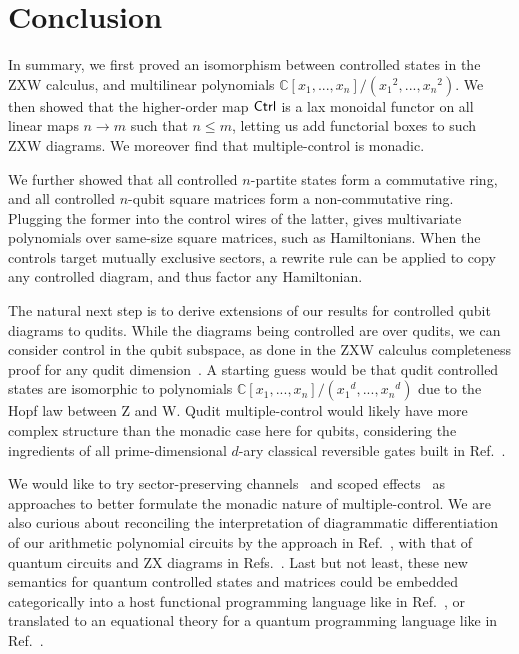 \section{Conclusion}
In summary, we first proved an isomorphism between controlled states in the ZXW calculus, and multilinear polynomials $\mathbb{C}[x_1,...,x_n]/({x_1}^2,...,{x_n}^2)$.
We then showed that the higher-order map $\textsf{Ctrl}$ is a lax monoidal functor on all linear maps $n \rightarrow m$ such that $n \leq m$, letting us add functorial boxes to such ZXW diagrams. We moreover find that multiple-control is monadic.

We further showed that all controlled $n$-partite states form a commutative ring, and all controlled $n$-qubit square matrices form a non-commutative ring. Plugging the former into the control wires of the latter, gives multivariate polynomials over same-size square matrices, such as Hamiltonians. When the controls target mutually exclusive sectors, a rewrite rule can be applied to copy any controlled diagram, and thus factor any Hamiltonian.

The natural next step is to derive extensions of our results for controlled qubit diagrams to qudits.
While the diagrams being controlled are over qudits, we can consider control in the qubit subspace, as done in the ZXW calculus completeness proof for any qudit dimension~\cite{poor2023completeness}.
A starting guess would be that qudit controlled states are isomorphic to polynomials $\mathbb{C}[x_1,...,x_n]/({x_1}^d,...,{x_n}^d)$ due to the Hopf law between Z and W.
Qudit multiple-control would likely have more complex structure than the monadic case here for qubits, considering the ingredients of all prime-dimensional $d$-ary classical reversible gates built in Ref.~\cite{Roy2023quditzh}.

We would like to try sector-preserving channels~\cite{Vanrietvelde2021ctrlsector} and scoped effects~\cite{lindley2024scoped} as approaches to better formulate the monadic nature of multiple-control.
We are also curious about reconciling the interpretation of diagrammatic differentiation of our arithmetic polynomial circuits by the approach in Ref.~\cite{wilson2023diffpolycirc}, with that of quantum circuits and ZX diagrams in Refs.~\cite{toumi2021diagdiff, wang2022diffintzx, jeandel2024adddiffzx}.
Last but not least, these new semantics for quantum controlled states and matrices could be embedded categorically into a host functional programming language like in Ref.~\cite{rennela2020clctrllinlogic}, or translated to an equational theory for a quantum programming language like in Ref.~\cite{staton2015algqpl}.